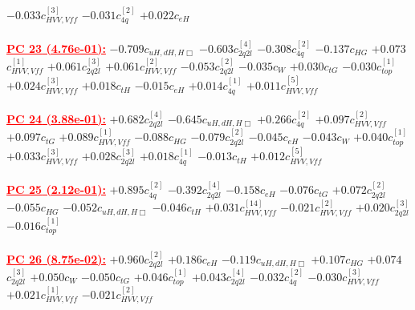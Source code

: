\documentclass{article}
\begin{document}
{$-0.033$}{\rm $c_{HVV,Vff}^{[3]}$} 
{$-0.031$}{\rm $c_{4q}^{[2]}$} 
{$+0.022$}{\rm $c_{eH}$} 
 \nonumber \\ \nonumber \\ 
\noindent \textcolor{red}{\underline{\bf{PC 23} (4.76e-01):}}
{$-0.709$}{\rm $c_{uH,dH,H\Box}$} 
{$-0.603$}{\rm $c_{2q2l}^{[4]}$} 
{$-0.308$}{\rm $c_{4q}^{[2]}$} 
{$-0.137$}{\rm $c_{HG}$} 
{$+0.073$}{\rm $c_{HVV,Vff}^{[1]}$} 
{$+0.061$}{\rm $c_{2q2l}^{[3]}$} 
{$+0.061$}{\rm $c_{HVV,Vff}^{[2]}$} 
{$-0.053$}{\rm $c_{2q2l}^{[2]}$} 
{$-0.035$}{\rm $c_{W}$} 
{$+0.030$}{\rm $c_{tG}$} 
{$-0.030$}{\rm $c_{top}^{[1]}$} 
{$+0.024$}{\rm $c_{HVV,Vff}^{[3]}$} 
{$+0.018$}{\rm $c_{tH}$} 
{$-0.015$}{\rm $c_{eH}$} 
{$+0.014$}{\rm $c_{4q}^{[1]}$} 
{$+0.011$}{\rm $c_{HVV,Vff}^{[5]}$} 
 \nonumber \\ \nonumber \\ 
\noindent \textcolor{red}{\underline{\bf{PC 24} (3.88e-01):}}
{$+0.682$}{\rm $c_{2q2l}^{[4]}$} 
{$-0.645$}{\rm $c_{uH,dH,H\Box}$} 
{$+0.266$}{\rm $c_{4q}^{[2]}$} 
{$+0.097$}{\rm $c_{HVV,Vff}^{[2]}$} 
{$+0.097$}{\rm $c_{tG}$} 
{$+0.089$}{\rm $c_{HVV,Vff}^{[1]}$} 
{$-0.088$}{\rm $c_{HG}$} 
{$-0.079$}{\rm $c_{2q2l}^{[2]}$} 
{$-0.045$}{\rm $c_{eH}$} 
{$-0.043$}{\rm $c_{W}$} 
{$+0.040$}{\rm $c_{top}^{[1]}$} 
{$+0.033$}{\rm $c_{HVV,Vff}^{[3]}$} 
{$+0.028$}{\rm $c_{2q2l}^{[3]}$} 
{$+0.018$}{\rm $c_{4q}^{[1]}$} 
{$-0.013$}{\rm $c_{tH}$} 
{$+0.012$}{\rm $c_{HVV,Vff}^{[5]}$} 
 \nonumber \\ \nonumber \\ 
\noindent \textcolor{red}{\underline{\bf{PC 25} (2.12e-01):}}
{$+0.895$}{\rm $c_{4q}^{[2]}$} 
{$-0.392$}{\rm $c_{2q2l}^{[4]}$} 
{$-0.158$}{\rm $c_{eH}$} 
{$-0.076$}{\rm $c_{tG}$} 
{$+0.072$}{\rm $c_{2q2l}^{[2]}$} 
{$-0.055$}{\rm $c_{HG}$} 
{$-0.052$}{\rm $c_{uH,dH,H\Box}$} 
{$-0.046$}{\rm $c_{tH}$} 
{$+0.031$}{\rm $c_{HVV,Vff}^{[14]}$} 
{$-0.021$}{\rm $c_{HVV,Vff}^{[2]}$} 
{$+0.020$}{\rm $c_{2q2l}^{[3]}$} 
{$-0.016$}{\rm $c_{top}^{[1]}$} 
 \nonumber \\ \nonumber \\ 
\noindent \textcolor{red}{\underline{\bf{PC 26} (8.75e-02):}}
{$+0.960$}{\rm $c_{2q2l}^{[2]}$} 
{$+0.186$}{\rm $c_{eH}$} 
{$-0.119$}{\rm $c_{uH,dH,H\Box}$} 
{$+0.107$}{\rm $c_{HG}$} 
{$+0.074$}{\rm $c_{2q2l}^{[3]}$} 
{$+0.050$}{\rm $c_{W}$} 
{$-0.050$}{\rm $c_{tG}$} 
{$+0.046$}{\rm $c_{top}^{[1]}$} 
{$+0.043$}{\rm $c_{2q2l}^{[4]}$} 
{$-0.032$}{\rm $c_{4q}^{[2]}$} 
{$-0.030$}{\rm $c_{HVV,Vff}^{[3]}$} 
{$+0.021$}{\rm $c_{HVV,Vff}^{[1]}$} 
{$-0.021$}{\rm $c_{HVV,Vff}^{[2]}$} 
 \nonumber \\ \nonumber \\ 
\end{document}
